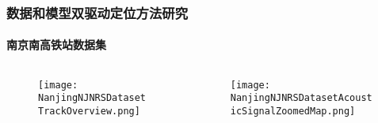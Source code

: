 \begin{frame} 
 	\frametitle{数据和模型双驱动定位方法研究}
 	\framesubtitle{南京南高铁站数据集}
	\begin{columns}[t]
		\begin{column}{0.5\textwidth}
		   	\begin{figure}
			    \texttt{[image: NanjingNJNRSDatasetTrackOverview.png]}
		   	\end{figure}  
		\end{column}   
		\begin{column}{0.5\textwidth}
		   	\begin{figure}
		   	\centering
		   	    \texttt{[image: NanjingNJNRSDatasetAcousticSignalZoomedMap.png]}
		   	\end{figure}
		\end{column}
	\end{columns}
\end{frame}
 
